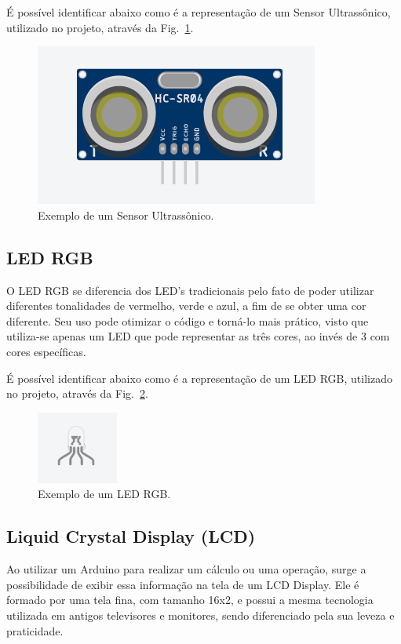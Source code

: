 \documentclass[conference]{IEEEtran}
\begin{document}
É possível identificar abaixo como é a representação de um Sensor Ultrassônico, utilizado no projeto, 
através da Fig.~\ref{fig2}.

\begin{figure}[htbp]
    \centerline{
        \includegraphics{imagens/Sensor.png}
        }
    \caption{Exemplo de um Sensor Ultrassônico.}
    \label{fig2}
    \end{figure}

\subsection{LED RGB}

    O LED RGB se diferencia dos LED's tradicionais pelo fato de poder utilizar diferentes tonalidades de
vermelho, verde e azul, a fim de se obter uma cor diferente. Seu uso pode otimizar o código e torná-lo
mais prático, visto que utiliza-se apenas um LED que pode representar as três cores, ao invés de 3 com
cores específicas.

É possível identificar abaixo como é a representação de um LED RGB, utilizado no projeto, através
da Fig.~\ref{fig3}.

\begin{figure}[htbp]
    \centerline{
        \includegraphics{imagens/LED_RGB.png}
        }
    \caption{Exemplo de um LED RGB.}
    \label{fig3}
    \end{figure}

\subsection{Liquid Crystal Display (LCD)}

    Ao utilizar um Arduino para realizar um cálculo ou uma operação, surge a possibilidade de exibir essa
informação na tela de um LCD Display. Ele é formado por uma tela fina, com tamanho 16x2, e possui a mesma
tecnologia utilizada em antigos televisores e monitores, sendo diferenciado pela sua leveza e praticidade.
\end{document}
